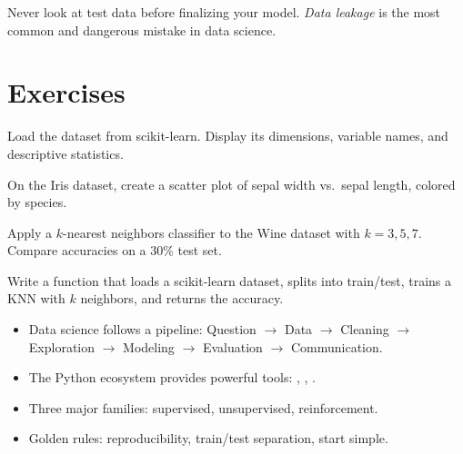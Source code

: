 \begin{warning}
Never look at test data before finalizing your model. \emph{Data leakage} is the most common and dangerous mistake in data science.
\end{warning}

\section{Exercises}

\begin{exercise}[$\star$]
Load the  dataset from scikit-learn. Display its dimensions, variable names, and descriptive statistics.
\end{exercise}

\begin{exercise}[$\star$]
On the Iris dataset, create a scatter plot of sepal width vs.\ sepal length, colored by species.
\end{exercise}

\begin{exercise}[$\star\star$]
Apply a $k$-nearest neighbors classifier to the Wine dataset with $k=3,5,7$. Compare accuracies on a 30\% test set.
\end{exercise}

\begin{exercise}[$\star\star$]
Write a function  that loads a scikit-learn dataset, splits into train/test, trains a KNN with $k$ neighbors, and returns the accuracy.
\end{exercise}

\begin{keyformulas}[title=\textbf{Chapter Summary}]
\begin{itemize}
\item Data science follows a pipeline: Question $\to$ Data $\to$ Cleaning $\to$ Exploration $\to$ Modeling $\to$ Evaluation $\to$ Communication.
\item The Python ecosystem provides powerful tools: , , .
\item Three major families: supervised, unsupervised, reinforcement.
\item Golden rules: reproducibility, train/test separation, start simple.
\end{itemize}
\end{keyformulas}
